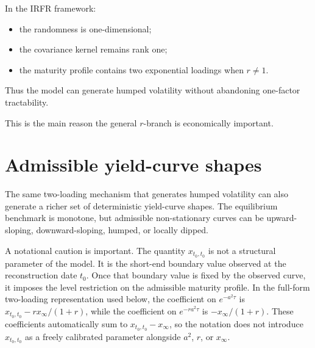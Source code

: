 \documentclass[11pt]{article}
\theoremstyle{plainbreak}
\begin{document}
In the IRFR framework:
\begin{itemize}
    \item the randomness is one-dimensional;
    \item the covariance kernel remains rank one;
    \item the maturity profile contains two exponential loadings when \(r\neq 1\).
\end{itemize}

Thus the model can generate humped volatility without abandoning one-factor tractability.

This is the main reason the general \(r\)-branch is economically important.


\section{Admissible yield-curve shapes}

The same two-loading mechanism that generates humped volatility can also generate a richer set of deterministic yield-curve shapes. The equilibrium benchmark is monotone, but admissible non-stationary curves can be upward-sloping, downward-sloping, humped, or locally dipped.

A notational caution is important. The quantity \(x_{t_0,t_0}\) is not a structural parameter of the model. It is the short-end boundary value observed at the reconstruction date \(t_0\). Once that boundary value is fixed by the observed curve, it imposes the level restriction on the admissible maturity profile. In the full-form two-loading representation used below, the coefficient on \(e^{-a^2\tau}\) is \(x_{t_0,t_0}-r x_\infty/(1+r)\), while the coefficient on \(e^{-ra^2\tau}\) is \(-x_\infty/(1+r)\). These coefficients automatically sum to \(x_{t_0,t_0}-x_\infty\), so the notation does not introduce \(x_{t_0,t_0}\) as a freely calibrated parameter alongside \(a^2\), \(r\), or \(x_\infty\).
\end{document}
